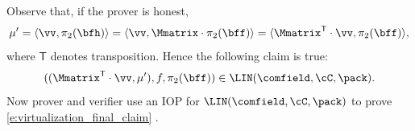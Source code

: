 \begin{construction}
\begin{enumerate}[leftmargin=*]
Observe that, if the prover is honest,
%
$$
\mu'=\langle \vv, \pi_2(\bfh)\rangle = \langle \vv, \Mmatrix\cdot \pi_2(\bff) \rangle = \langle \Mmatrix^{\mathsf{T}}\cdot \vv, \pi_2(\bff)\rangle,
$$
%
where $\mathsf{T}$ denotes transposition. Hence the following claim is true:
%
\begin{equation}\label{e:virtualization_final_claim}
((\Mmatrix^{\mathsf{T}}\cdot \vv, \mu'), f, \pi_2(\bff)) \in \LIN(\comfield, \cC, \pack).
\end{equation}
%
Now prover and verifier use an IOP for $\LIN(\comfield, \cC, \pack)$ to prove \eqref{e:virtualization_final_claim} . 
\end{enumerate}
%
\end{construction}

\begin{remark}
\end{remark}

